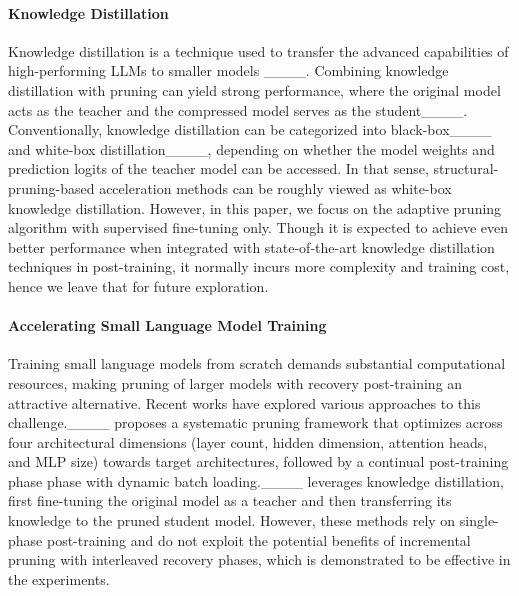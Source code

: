 \paragraph{Knowledge Distillation} Knowledge distillation is a technique used to transfer the advanced capabilities of high-performing LLMs to smaller models ____. Combining knowledge distillation with pruning can yield strong performance, where the original model acts as the teacher and the compressed model serves as the student____.
Conventionally, knowledge distillation can be categorized into black-box____ and white-box distillation____, depending on whether the model weights and prediction logits of the teacher model can be accessed. In that sense, structural-pruning-based acceleration methods can be roughly viewed as white-box knowledge distillation. However,
in this paper, we focus on the adaptive pruning algorithm with supervised fine-tuning only. Though it is expected to achieve even better performance when integrated with state-of-the-art knowledge distillation techniques in post-training, it normally incurs more complexity and training cost, hence we leave that for future exploration.

 \paragraph{Accelerating Small Language Model Training} Training small language models from scratch demands substantial computational resources, making pruning of larger models with recovery post-training an attractive alternative. Recent works have explored various approaches to this challenge.____ proposes a systematic pruning framework that optimizes across four architectural dimensions (layer count, hidden dimension, attention heads, and MLP size) towards target architectures, followed by a continual post-training phase phase with dynamic batch loading.____ leverages knowledge distillation, first fine-tuning the original model as a teacher and then transferring its knowledge to the pruned student model. However, these methods rely on single-phase post-training and do not exploit the potential benefits of incremental pruning with interleaved recovery phases, which is demonstrated to be effective in the experiments.